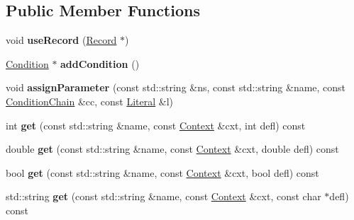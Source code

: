\subsection*{Public Member Functions}
\begin{DoxyCompactItemize}
\item 
\hypertarget{classcfg_1_1CfgDocument_a7e9717619972b99699367c1d55978b23}{void {\bfseries use\-Record} (\hyperlink{classcfg_1_1Record}{Record} $\ast$)}\label{classcfg_1_1CfgDocument_a7e9717619972b99699367c1d55978b23}

\item 
\hypertarget{classcfg_1_1CfgDocument_a13259bc4813ea81c8a19d23ac7a66e0e}{\hyperlink{classcfg_1_1Condition}{Condition} $\ast$ {\bfseries add\-Condition} ()}\label{classcfg_1_1CfgDocument_a13259bc4813ea81c8a19d23ac7a66e0e}

\item 
\hypertarget{classcfg_1_1CfgDocument_a563af2fe3335a03c7ce2b49aeb01b251}{void {\bfseries assign\-Parameter} (const std\-::string \&ns, const std\-::string \&name, const \hyperlink{classcfg_1_1ConditionChain}{Condition\-Chain} \&cc, const \hyperlink{classcfg_1_1Literal}{Literal} \&l)}\label{classcfg_1_1CfgDocument_a563af2fe3335a03c7ce2b49aeb01b251}

\item 
\hypertarget{classcfg_1_1CfgDocument_a6b7c7570b0f29381e06fbcd4f14bf5a0}{int {\bfseries get} (const std\-::string \&name, const \hyperlink{classcfg_1_1Context}{Context} \&cxt, int defl) const }\label{classcfg_1_1CfgDocument_a6b7c7570b0f29381e06fbcd4f14bf5a0}

\item 
\hypertarget{classcfg_1_1CfgDocument_adcfac4c55418d640d2a92584f9cc7f84}{double {\bfseries get} (const std\-::string \&name, const \hyperlink{classcfg_1_1Context}{Context} \&cxt, double defl) const }\label{classcfg_1_1CfgDocument_adcfac4c55418d640d2a92584f9cc7f84}

\item 
\hypertarget{classcfg_1_1CfgDocument_a2f205dc62685981c29bd01d8b110ca64}{bool {\bfseries get} (const std\-::string \&name, const \hyperlink{classcfg_1_1Context}{Context} \&cxt, bool defl) const }\label{classcfg_1_1CfgDocument_a2f205dc62685981c29bd01d8b110ca64}

\item 
\hypertarget{classcfg_1_1CfgDocument_a126dda4f1bb8732e531e4371ef15589e}{std\-::string {\bfseries get} (const std\-::string \&name, const \hyperlink{classcfg_1_1Context}{Context} \&cxt, const char $\ast$defl) const }\label{classcfg_1_1CfgDocument_a126dda4f1bb8732e531e4371ef15589e}


\end{DoxyCompactItemize}

